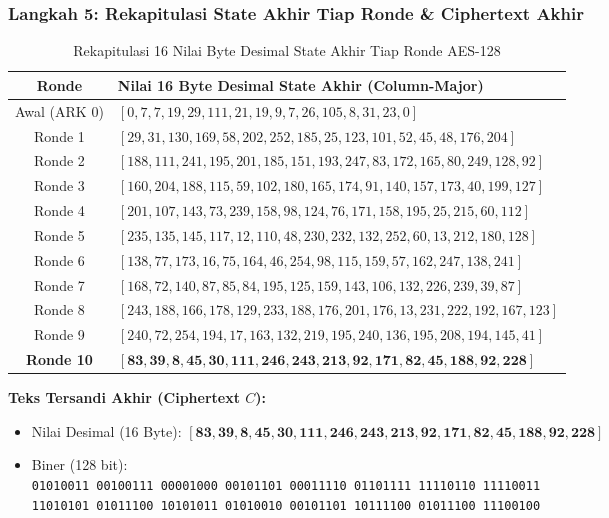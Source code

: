 \documentclass[11pt,a4paper]{article}
\begin{document}
\subsubsection*{Langkah 5: Rekapitulasi State Akhir Tiap Ronde \& Ciphertext Akhir}
\begin{table}[H]
\centering
\small
\caption{Rekapitulasi 16 Nilai Byte Desimal State Akhir Tiap Ronde AES-128}
\vspace{0.2cm}
\begin{tabular}{cl}
\toprule
\textbf{Ronde} & \textbf{Nilai 16 Byte Desimal State Akhir (Column-Major)} \\
\midrule
Awal (ARK 0) & $[0, 7, 7, 19, 29, 111, 21, 19, 9, 7, 26, 105, 8, 31, 23, 0]$ \\
Ronde 1  & $[29, 31, 130, 169, 58, 202, 252, 185, 25, 123, 101, 52, 45, 48, 176, 204]$ \\
Ronde 2  & $[188, 111, 241, 195, 201, 185, 151, 193, 247, 83, 172, 165, 80, 249, 128, 92]$ \\
Ronde 3  & $[160, 204, 188, 115, 59, 102, 180, 165, 174, 91, 140, 157, 173, 40, 199, 127]$ \\
Ronde 4  & $[201, 107, 143, 73, 239, 158, 98, 124, 76, 171, 158, 195, 25, 215, 60, 112]$ \\
Ronde 5  & $[235, 135, 145, 117, 12, 110, 48, 230, 232, 132, 252, 60, 13, 212, 180, 128]$ \\
Ronde 6  & $[138, 77, 173, 16, 75, 164, 46, 254, 98, 115, 159, 57, 162, 247, 138, 241]$ \\
Ronde 7  & $[168, 72, 140, 87, 85, 84, 195, 125, 159, 143, 106, 132, 226, 239, 39, 87]$ \\
Ronde 8  & $[243, 188, 166, 178, 129, 233, 188, 176, 201, 176, 13, 231, 222, 192, 167, 123]$ \\
Ronde 9  & $[240, 72, 254, 194, 17, 163, 132, 219, 195, 240, 136, 195, 208, 194, 145, 41]$ \\
\midrule
\textbf{Ronde 10} & $\mathbf{[83, 39, 8, 45, 30, 111, 246, 243, 213, 92, 171, 82, 45, 188, 92, 228]}$ \\
\bottomrule
\end{tabular}
\end{table}

\textbf{Teks Tersandi Akhir (Ciphertext $C$):}
\begin{itemize}[leftmargin=*]
    \item Nilai Desimal (16 Byte): $\mathbf{[83, 39, 8, 45, 30, 111, 246, 243, 213, 92, 171, 82, 45, 188, 92, 228]}$
    \item Biner (128 bit):\\
    \texttt{01010011 00100111 00001000 00101101 00011110 01101111 11110110 11110011}\\
    \texttt{11010101 01011100 10101011 01010010 00101101 10111100 01011100 11100100}
\end{itemize}
\end{document}
